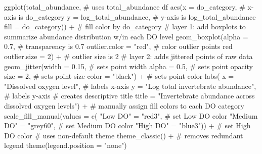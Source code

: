 \documentclass[
  letterpaper,
  DIV=11,
  numbers=noendperiod]{scrartcl}
\newenvironment{Shaded}{\begin{snugshade}}{\end{snugshade}}
\newcommand{\AttributeTok}[1]{\textcolor[rgb]{0.40,0.45,0.13}{#1}}
\newcommand{\CommentTok}[1]{\textcolor[rgb]{0.37,0.37,0.37}{#1}}
\newcommand{\DecValTok}[1]{\textcolor[rgb]{0.68,0.00,0.00}{#1}}
\newcommand{\FloatTok}[1]{\textcolor[rgb]{0.68,0.00,0.00}{#1}}
\newcommand{\FunctionTok}[1]{\textcolor[rgb]{0.28,0.35,0.67}{#1}}
\newcommand{\NormalTok}[1]{\textcolor[rgb]{0.00,0.23,0.31}{#1}}
\newcommand{\OtherTok}[1]{\textcolor[rgb]{0.00,0.23,0.31}{#1}}
\newcommand{\SpecialCharTok}[1]{\textcolor[rgb]{0.37,0.37,0.37}{#1}}
\newcommand{\StringTok}[1]{\textcolor[rgb]{0.13,0.47,0.30}{#1}}
\begin{document}
\begin{Shaded}
\begin{Highlighting}[]
\FunctionTok{ggplot}\NormalTok{(total\_abundance, }\CommentTok{\# uses total\_abundance df}
       \FunctionTok{aes}\NormalTok{(}\AttributeTok{x =}\NormalTok{ do\_category, }\CommentTok{\# x{-}axis is do\_category}
           \AttributeTok{y =}\NormalTok{ log\_total\_abundance, }\CommentTok{\# y{-}axis is log\_total\_abundance}
           \AttributeTok{fill =}\NormalTok{ do\_category)) }\SpecialCharTok{+} \CommentTok{\# fill color by do\_category}
  \CommentTok{\# layer 1: add boxplots to summarize abundance distribution w/in each DO level }
  \FunctionTok{geom\_boxplot}\NormalTok{(}\AttributeTok{alpha =} \FloatTok{0.7}\NormalTok{, }\CommentTok{\# transparency is 0.7}
               \AttributeTok{outlier.color =} \StringTok{"red"}\NormalTok{, }\CommentTok{\# color outlier points red}
               \AttributeTok{outlier.size =} \DecValTok{2}\NormalTok{) }\SpecialCharTok{+} \CommentTok{\# outlier size is 2}
  \CommentTok{\# layer 2: adds jittered points of raw data}
  \FunctionTok{geom\_jitter}\NormalTok{(}\AttributeTok{width =} \FloatTok{0.15}\NormalTok{, }\CommentTok{\# sets point width}
              \AttributeTok{alpha =} \FloatTok{0.5}\NormalTok{, }\CommentTok{\# sets point opacity}
              \AttributeTok{size =} \DecValTok{2}\NormalTok{, }\CommentTok{\# sets point size}
              \AttributeTok{color =} \StringTok{"black"}\NormalTok{) }\SpecialCharTok{+} \CommentTok{\# sets point color}
  \FunctionTok{labs}\NormalTok{(}
    \AttributeTok{x =} \StringTok{"Dissolved oxygen level"}\NormalTok{, }\CommentTok{\# labels x{-}axis}
    \AttributeTok{y =} \StringTok{"Log total invertebrate abundance"}\NormalTok{, }\CommentTok{\# labels y{-}axis}
    \CommentTok{\# creates descriptive title}
    \AttributeTok{title =} \StringTok{"Invertebrate abundance across dissolved oxygen levels"}\NormalTok{) }\SpecialCharTok{+}
  \CommentTok{\# manually assign fill colors to each DO category}
  \FunctionTok{scale\_fill\_manual}\NormalTok{(}\AttributeTok{values =} \FunctionTok{c}\NormalTok{(}
    \StringTok{"Low DO"} \OtherTok{=} \StringTok{"red3"}\NormalTok{, }\CommentTok{\# set Low DO color}
    \StringTok{"Medium DO"} \OtherTok{=} \StringTok{"grey60"}\NormalTok{, }\CommentTok{\# set Medium DO color}
    \StringTok{"High DO"} \OtherTok{=} \StringTok{"blue3"}\NormalTok{)) }\SpecialCharTok{+} \CommentTok{\# set High DO color}
  \CommentTok{\# uses non{-}default theme}
  \FunctionTok{theme\_classic}\NormalTok{() }\SpecialCharTok{+}
  \CommentTok{\# removes redundant legend}
  \FunctionTok{theme}\NormalTok{(}\AttributeTok{legend.position =} \StringTok{"none"}\NormalTok{)}
\end{Highlighting}
\end{Shaded}
\end{document}
